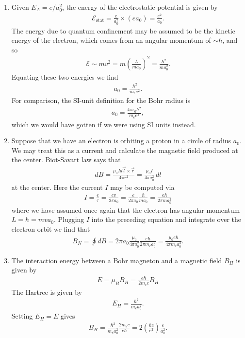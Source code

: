 \documentclass{article}
\theoremstyle{definition}
\newcommand{\f}[2]{\frac{#1}{#2}}
\newcommand{\lp}{\left(}
\newcommand{\rp}{\right)}
\begin{document}
\begin{enumerate}[label=\alph*)]
	\item Given $E_A = e/a_0^2$, the energy of the electrostatic potential is given by 
	\begin{align*}
	\mathcal{E}_\text{stat} = \f{e}{a_0^2} \times (e a_0) = \f{e^2}{a_0}.
	\end{align*}
	The energy due to quantum confinement may be assumed to be the kinetic energy of the electron, which comes from an angular momentum of $\sim \hbar$, and so 
	\begin{align*}
	\mathcal{E} \sim mv^2 = m \lp \f{L}{ma_0}\rp^2 = \f{\hbar^2}{m a_0^2}.
	\end{align*}
	Equating these two energies we find 
	\begin{align*}
	a_0 = \f{\hbar^2}{m_e e^2}.
	\end{align*}
	For comparison, the SI-unit definition for the Bohr radius is 
	\begin{align*}
	a_0 = \f{4\pi \epsilon_0\hbar^2}{ m_e  e^2},
	\end{align*} 
	which we would have gotten if we were using SI units instead. 
	
	\item Suppose that we have an electron is orbiting a proton in a circle of radius $a_0$. We may treat this as a current and calculate the magnetic field produced at the center. Biot-Savart law says that
	\begin{align*}
	dB = \f{\mu_0 I d\vec{l}\times \vec{r}}{4\pi r^2} = \f{\mu_0 I }{4\pi a_0^2}\,dl
	\end{align*}
	at the center. Here the current $I$ may be computed via
	\begin{align*}
	I = \f{e}{\tau} = \f{e v}{2\pi a_0} = \f{e}{2\pi a_0} \f{\hbar}{ma_0} = \f{e \hbar }{2\pi ma_0^2}
	\end{align*}
	where we have assumed once again that the electron has angular momentum $L = \hbar =  mva_0$. Plugging $I$ into the preceding equation and integrate over the electron orbit we find that
	\begin{align*}
	B_N = \oint dB = 2\pi a_0 \f{\mu_0 }{4\pi a_0^2}\f{e \hbar }{2\pi m_e a_0^2} = \f{\mu_0 e \hbar}{4\pi m_e a_0^3}.
	\end{align*}
	
	\item The interaction energy between a Bohr magneton and a magnetic field $B_H$ is given by 
	\begin{align*}
	E = \mu_B B_H = \f{e \hbar}{2 m_e c} B_H
	\end{align*}
	The Hartree is given by 
	\begin{align*}
	E_H = \f{\hbar^2}{m_e a_0^2}.
	\end{align*}
	Setting $E_H = E$ gives
	\begin{align*}
	B_H = \f{\hbar^2}{m_ea_0^2} \f{2m_e c}{e\hbar} = 2\lp \f{\hbar c}{e^2} \rp \f{e}{a_0^2}.
	\end{align*} 
	

\end{enumerate}
\end{document}
